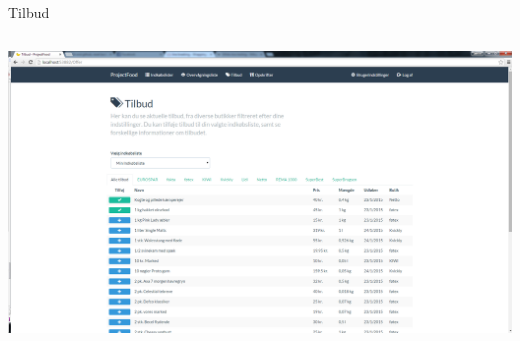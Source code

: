 \begin{frame}{Tilbud}

	
	\begin{minipage}[0.3\textheight]{\textwidth}
	\begin{columns}[T]
	\begin{column}{1\textwidth}
	 \includegraphics[width=1\textwidth,height=1\textheight,keepaspectratio, trim={1cm 0 0 16mm}, clip]{images/Screenshots/Offers.png}
	
	\end{column}

	\end{columns}

  \end{minipage}
	
\end{frame}
